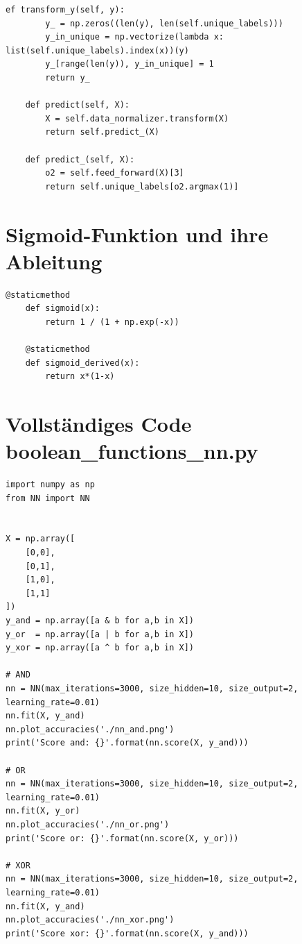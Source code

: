 \begin{lstlisting}[style=py]
ef transform_y(self, y):
        y_ = np.zeros((len(y), len(self.unique_labels)))
        y_in_unique = np.vectorize(lambda x: list(self.unique_labels).index(x))(y)
        y_[range(len(y)), y_in_unique] = 1
        return y_

    def predict(self, X):
        X = self.data_normalizer.transform(X)
        return self.predict_(X)

    def predict_(self, X):
        o2 = self.feed_forward(X)[3]
        return self.unique_labels[o2.argmax(1)]
\end{lstlisting}


\section*{Sigmoid-Funktion und ihre Ableitung}

\begin{lstlisting}[style=py]
@staticmethod
    def sigmoid(x):
        return 1 / (1 + np.exp(-x))

    @staticmethod
    def sigmoid_derived(x):
        return x*(1-x)
\end{lstlisting}

\section*{Vollständiges Code boolean\_functions\_nn.py}

\begin{lstlisting}[style=py]
import numpy as np
from NN import NN


X = np.array([
    [0,0],
    [0,1],
    [1,0],
    [1,1]
])
y_and = np.array([a & b for a,b in X])
y_or  = np.array([a | b for a,b in X])
y_xor = np.array([a ^ b for a,b in X])

# AND
nn = NN(max_iterations=3000, size_hidden=10, size_output=2, learning_rate=0.01)
nn.fit(X, y_and)
nn.plot_accuracies('./nn_and.png')
print('Score and: {}'.format(nn.score(X, y_and)))

# OR
nn = NN(max_iterations=3000, size_hidden=10, size_output=2, learning_rate=0.01)
nn.fit(X, y_or)
nn.plot_accuracies('./nn_or.png')
print('Score or: {}'.format(nn.score(X, y_or)))

# XOR
nn = NN(max_iterations=3000, size_hidden=10, size_output=2, learning_rate=0.01)
nn.fit(X, y_and)
nn.plot_accuracies('./nn_xor.png')
print('Score xor: {}'.format(nn.score(X, y_and)))

\end{lstlisting}

